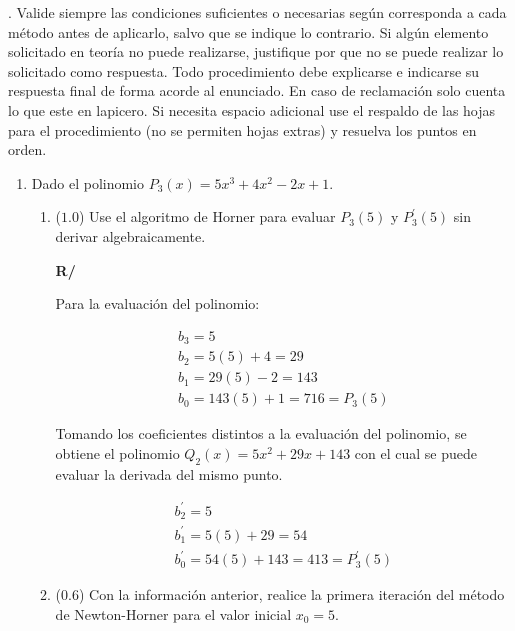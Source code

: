 \documentclass[12pt]{article}
\begin{document}
.
Valide siempre las condiciones suficientes o necesarias según corresponda a cada método antes de aplicarlo, salvo que se indique lo contrario. Si algún elemento solicitado en teoría no puede realizarse, justifique por que no se puede realizar lo solicitado como respuesta. Todo procedimiento debe explicarse e indicarse su respuesta final de forma acorde al enunciado. %
En caso de reclamación solo cuenta lo que este en lapicero. %
Si necesita espacio adicional %
use el respaldo de las hojas para el procedimiento (no se permiten hojas extras) y resuelva los puntos en orden. %







\vspace{-.5cm}
  \begin{enumerate}[leftmargin=*,widest=9]


    \item Dado el polinomio \(P_3(x) = 5x^3 + 4x^2 -2x +1\).

   \begin{enumerate}[label=\alph*]
    \item (\(1.0\)) Use el algoritmo de Horner para evaluar \(P_3(5)\) y \(P_3^\prime(5)\) sin derivar algebraicamente.


    \textbf{R/}

    Para la evaluación del polinomio:

    \begin{eqnarray*}
    b_3 = 5\\
    b_2 = 5(5) + 4 = 29\\
    b_1 = 29(5) - 2 = 143\\
    b_0 = 143(5) + 1 = 716 = P_3(5)
    \end{eqnarray*}

    Tomando los coeficientes distintos a la evaluación del polinomio, se obtiene el polinomio \(Q_2(x) = 5x^2 +29x+143\) con el cual se puede evaluar la derivada del mismo punto.

    \begin{eqnarray*}
    b^{\prime}_2 = 5\\
    b^{\prime}_1 = 5(5) + 29 = 54\\
    b^{\prime}_0 = 54(5) + 143 = 413 = P_3^{\prime}(5)
    \end{eqnarray*}

    \item (\(0.6\)) Con la información anterior, realice la primera iteración del método de Newton-Horner para el valor inicial \(x_0=5\).



\end{enumerate}
\end{enumerate}
\end{document}

